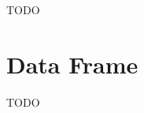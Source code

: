 \documentclass[pdflatex]{article}
\begin{document}
TODO

\section{Data Frame}

TODO

% 
% 
% 
% 
% 
% 
% 
% 
% 
% 

\end{document}
